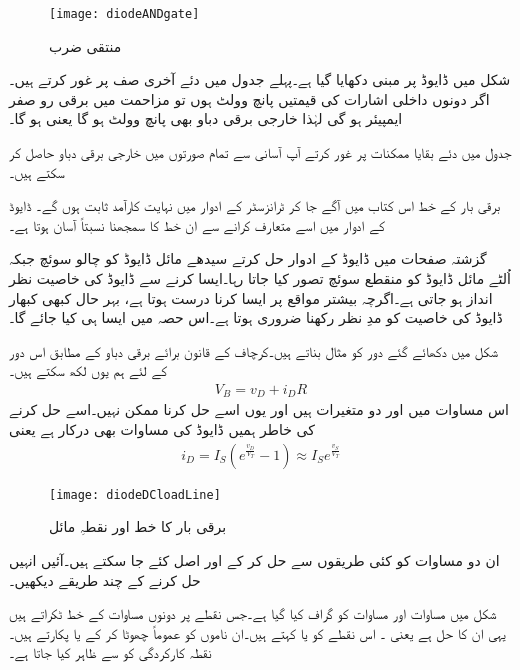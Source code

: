 \begin{figure}
\centering
\texttt{[image: diodeANDgate]}
\caption{منتقی ضرب}
\label{شکل_منتقی_ضرب}
\end{figure}
شکل  میں ڈایوڈ   پر مبنی   دکھایا گیا ہے۔پہلے جدول میں دئے آخری صف پر غور کرتے ہیں۔اگر دونوں داخلی اشارات کی قیمتیں پانچ وولٹ  ہوں تو مزاحمت میں برقی رو صفر ایمپیئر ہو گی لہٰذا خارجی برقی دباو بھی پانچ وولٹ ہو گا یعنی  ہو گا۔

جدول میں دئے بقایا ممکنات پر غور کرتے آپ آسانی سے تمام صورتوں میں خارجی برقی دباو حاصل کر سکتے ہیں۔


 \label{حصہ_یکسمتی_برقی_بار_کا_خط}
	برقی بار کے خط اس کتاب میں آگے جا کر ٹرانزسٹر کے ادوار میں  نہایت کارآمد ثابت ہوں گے۔ ڈایوڈ کے ادوار میں اسے متعارف کرانے سے ان خط کا سمجھنا نسبتاً آسان ہوتا ہے۔

گزشتہ صفحات میں ڈایوڈ کے ادوار حل کرتے سیدھے مائل ڈایوڈ کو چالو سوئچ جبکہ اُلٹے مائل ڈایوڈ کو منقطع سوئچ تصور کیا جاتا رہا۔ایسا کرنے سے ڈایوڈ کی خاصیت نظر انداز ہو جاتی ہے۔اگرچہ بیشتر مواقع پر ایسا کرنا درست ہوتا ہے، بہر حال کبھی کبھار ڈایوڈ کی خاصیت کو مدِ نظر رکھنا ضروری ہوتا ہے۔اس حصہ میں ایسا ہی کیا جائے گا۔

شکل   میں دکھائے گئے دور کو مثال بناتے ہیں۔کرچاف کے قانون برائے برقی دباو کے مطابق اس دور کے لئے ہم یوں لکھ سکتے ہیں۔
\begin{align} \label{مساوات_ڈایوڈ_بار_کا_خط}
V_B=v_D+i_D R
\end{align}
اس مساوات میں  اور  دو متغیرات ہیں اور یوں اسے حل کرنا ممکن نہیں۔اسے حل کرنے کی خاطر ہمیں ڈایوڈ کی مساوات بھی درکار ہے یعنی
\begin{align} \label{مساوات_ڈایوڈ_کا_خط_جس_پر_بار_لدا_جائے}
i_D=I_S \left (e^{\frac{v_D}{V_T}}-1 \right ) \approx I_S e^{\frac{v_S}{V_T}}
\end{align}
%
\begin{figure}
\centering
\texttt{[image: diodeDCloadLine]}
\caption{ برقی بار کا خط اور نقطہِ مائل}
\label{شکل_ڈایوڈ_بار_کا_خط}
\end{figure}
	ان دو مساوات کو کئی طریقوں سے حل کر کے  اور  اصل کئے جا سکتے ہیں۔آئیں انہیں حل کرنے کے چند طریقے دیکھیں۔

شکل  میں مساوات   اور مساوات   کو گراف کیا گیا ہے۔جس نقطے پر دونوں مساوات کے خط ٹکراتے ہیں یہی ان کا حل ہے یعنی ۔ اس نقطے کو  یا   کہتے ہیں۔ان ناموں کو عموماً چھوٹا کر کے  یا  پکارتے ہیں۔نقطہ کارکردگی کو  سے ظاہر کیا جاتا ہے۔

